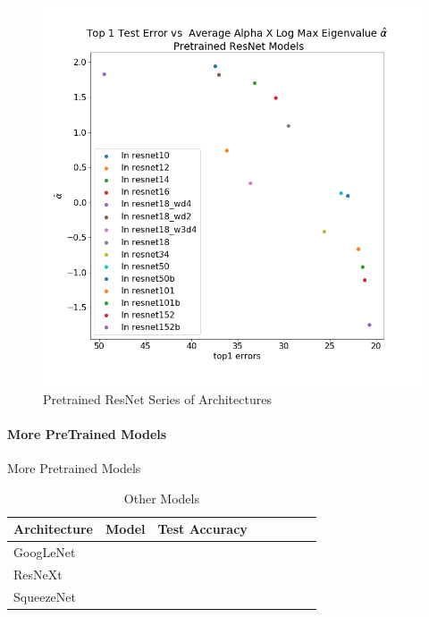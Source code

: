 \begin{figure}[!htb]
 \centering
   \includegraphics[scale=0.30]{img/ResNet-w_alphas.png}
   \caption{
Pretrained ResNet Series of Architectures}
  \label{fig:resnet}
\end{figure}






\paragraph{More PreTrained Models}

More Pretrained Models


\begin{table}[t]
\small
\begin{center}
\begin{tabular}{|p{1in}|c|c|c|c|c|c|c|}
\hline
Architecture 
 & Model
 & Test Accuracy \\
\hline
GoogLeNet & & \\
\hline
ResNeXt & & \\
\hline
SqueezeNet & & \\
\hline
\end{tabular}
\end{center}
\caption{Other Models}
\label{table:models}
\end{table}





